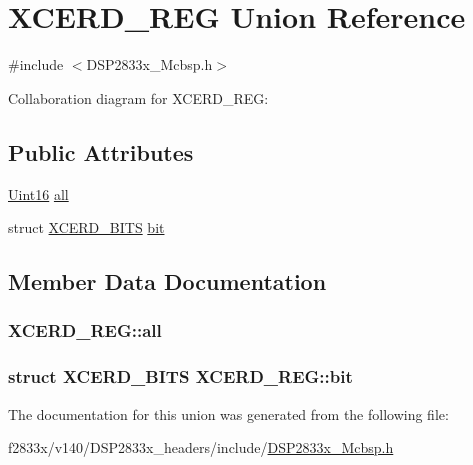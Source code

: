 \hypertarget{union_x_c_e_r_d___r_e_g}{}\section{X\+C\+E\+R\+D\+\_\+\+R\+E\+G Union Reference}
\label{union_x_c_e_r_d___r_e_g}


{\ttfamily \#include $<$D\+S\+P2833x\+\_\+\+Mcbsp.\+h$>$}



Collaboration diagram for X\+C\+E\+R\+D\+\_\+\+R\+E\+G\+:
\subsection*{Public Attributes}
\begin{DoxyCompactItemize}
\item 
\hyperlink{_d_s_p2833x___device_8h_a59a9f6be4562c327cbfb4f7e8e18f08b}{Uint16} \hyperlink{union_x_c_e_r_d___r_e_g_a779c0db42b7fd5cbb17478dd5910f8c9}{all}
\item 
struct \hyperlink{struct_x_c_e_r_d___b_i_t_s}{X\+C\+E\+R\+D\+\_\+\+B\+I\+T\+S} \hyperlink{union_x_c_e_r_d___r_e_g_ab2ef4c8c6749f5f9e353dc9e43448717}{bit}
\end{DoxyCompactItemize}


\subsection{Member Data Documentation}
\hypertarget{union_x_c_e_r_d___r_e_g_a779c0db42b7fd5cbb17478dd5910f8c9}{}
\subsubsection[{all}]{ X\+C\+E\+R\+D\+\_\+\+R\+E\+G\+::all}\label{union_x_c_e_r_d___r_e_g_a779c0db42b7fd5cbb17478dd5910f8c9}
\hypertarget{union_x_c_e_r_d___r_e_g_ab2ef4c8c6749f5f9e353dc9e43448717}{}
\subsubsection[{bit}]{\setlength{\rightskip}{0pt plus 5cm}struct {\bf X\+C\+E\+R\+D\+\_\+\+B\+I\+T\+S} X\+C\+E\+R\+D\+\_\+\+R\+E\+G\+::bit}\label{union_x_c_e_r_d___r_e_g_ab2ef4c8c6749f5f9e353dc9e43448717}


The documentation for this union was generated from the following file\+:\begin{DoxyCompactItemize}
\item 
f2833x/v140/\+D\+S\+P2833x\+\_\+headers/include/\hyperlink{_d_s_p2833x___mcbsp_8h}{D\+S\+P2833x\+\_\+\+Mcbsp.\+h}\end{DoxyCompactItemize}

